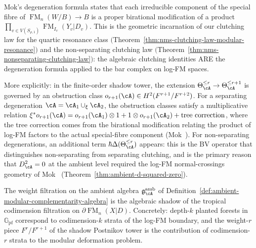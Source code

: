 \begin{remark}[Degeneration formula $=$ clutching law]
\label{rem:degeneration-equals-clutching}%
%
Mok's degeneration formula \cite[Theorem~5.3.4]{Mok25} states that
each irreducible component of the special fibre of
$\operatorname{FM}_n(W/B) \to B$ is a proper birational modification
of a product
$\prod_{v \in V(S_{\rho,1})} \operatorname{FM}_{I_v}(Y_v|D_v)$.
This is the geometric incarnation of our clutching law for the
quartic resonance class
$($Theorem~\textup{\ref{thm:nms-clutching-law-modular-resonance}}$)$
and the non-separating clutching law
$($Theorem~\textup{\ref{thm:nms-nonseparating-clutching-law}}$)$:
the algebraic clutching identities ARE the degeneration formula
applied to the bar complex on log-FM spaces.

More explicitly: in the finite-order shadow tower, the extension
$\Theta_\cA^{\leq r} \to \Theta_\cA^{\leq r+1}$ is governed by an
obstruction class $o_{r+1}(\cA) \in H^2(F^{r+1}/F^{r+2})$.  For a
separating degeneration $\cA = \cA_1 \cup_\xi \cA_2$, the
obstruction classes satisfy a multiplicative relation
$\xi^* o_{r+1}(\cA) = o_{r+1}(\cA_1) \otimes 1 + 1 \otimes
o_{r+1}(\cA_2) + \text{tree correction}$,
where the tree correction comes from the birational modification
relating the product of log-FM factors to the actual special-fibre
component (Mok~\cite[Theorem~5.3.4]{Mok25}).
For non-separating degenerations, an additional term
$\hbar\Delta(\Theta_\cA^{\leq r})$ appears: this is the
BV operator that distinguishes non-separating from separating
clutching, and is the primary reason that
$D_\cA^2 = 0$ at the ambient level required the log-FM
normal-crossings geometry of Mok~\cite[Theorem~3.3.1]{Mok25}
(Theorem~\ref{thm:ambient-d-squared-zero}).
\end{remark}

\begin{corollary}[Weight filtration = tropical codimension;
\ClaimStatusProvedElsewhere]
\label{cor:weight-filtration-tropical}
The weight filtration on the ambient algebra
$\mathfrak{g}^{\mathrm{amb}}_\cA$ of
Definition~\textup{\ref{def:ambient-modular-complementarity-algebra}}
is the algebraic shadow of the tropical codimension filtration on
$\partial\overline{\operatorname{FM}}_n(X|D)$.  Concretely:
depth-$k$ planted forests in $\mathbb{G}_{\mathrm{pf}}$ correspond
to codimension-$k$ strata of the log-FM boundary, and the
weight-$r$ piece $F^r/F^{r+1}$ of the shadow Postnikov tower is the
contribution of codimension-$r$ strata to the modular deformation
problem.
\end{corollary}

